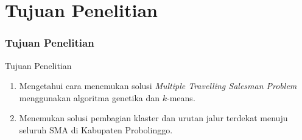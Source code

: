 \section{Tujuan Penelitian}
\begin{frame}
\frametitle{Tujuan Penelitian}
\begin{block}{Tujuan Penelitian}
\begin{enumerate}
\item Mengetahui cara menemukan solusi \textit{Multiple Travelling Salesman Problem} menggunakan algoritma genetika dan $k$-means.
\item Menemukan solusi pembagian klaster dan urutan jalur terdekat menuju seluruh SMA di Kabupaten Probolinggo.
\end{enumerate}
\end{block}
\end{frame}